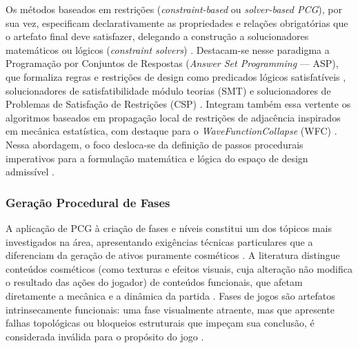 Os métodos baseados em restrições (\textit{constraint-based} ou \textit{solver-based PCG}), por sua vez, especificam declarativamente as propriedades e relações obrigatórias que o artefato final deve satisfazer, delegando a construção a solucionadores matemáticos ou lógicos (\textit{constraint solvers}) \cite{tanagra, smith2011answer, linden2014dungeons, pcgbook, summerville2018procedural}. Destacam-se nesse paradigma a Programação por Conjuntos de Respostas (\textit{Answer Set Programming} --- ASP), que formaliza regras e restrições de design como predicados lógicos satisfatíveis \cite{smith2011answer}, solucionadores de satisfatibilidade módulo teorias (SMT) e solucionadores de Problemas de Satisfação de Restrições (CSP) \cite{tanagra, chen2025narrative}. Integram também essa vertente os algoritmos baseados em propagação local de restrições de adjacência inspirados em mecânica estatística, com destaque para o \textit{WaveFunctionCollapse} (WFC) \cite{karth2017wavefunctioncollapse, maleki2024procedural}. Nessa abordagem, o foco desloca-se da definição de passos procedurais imperativos para a formulação matemática e lógica do espaço de design admissível \cite{tanagra, smith2011answer, linden2014dungeons}.

\subsubsection{Geração Procedural de Fases}
\label{sec:pcg_fases}

A aplicação de PCG à criação de fases e níveis constitui um dos tópicos mais investigados na área, apresentando exigências técnicas particulares que a diferenciam da geração de ativos puramente cosméticos \cite{summerville2018procedural, maleki2024procedural}. A literatura distingue conteúdos cosméticos (como texturas e efeitos visuais, cuja alteração não modifica o resultado das ações do jogador) de conteúdos funcionais, que afetam diretamente a mecânica e a dinâmica da partida \cite{summerville2018procedural}. Fases de jogos são artefatos intrinsecamente funcionais: uma fase visualmente atraente, mas que apresente falhas topológicas ou bloqueios estruturais que impeçam sua conclusão, é considerada inválida para o propósito do jogo \cite{summerville2018procedural, linden2014dungeons}.


